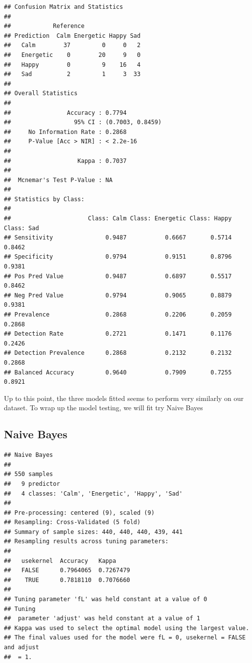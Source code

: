 \documentclass[11pt,]{article}
\begin{document}
\begin{verbatim}
## Confusion Matrix and Statistics
## 
##            Reference
## Prediction  Calm Energetic Happy Sad
##   Calm        37         0     0   2
##   Energetic    0        20     9   0
##   Happy        0         9    16   4
##   Sad          2         1     3  33
## 
## Overall Statistics
##                                           
##                Accuracy : 0.7794          
##                  95% CI : (0.7003, 0.8459)
##     No Information Rate : 0.2868          
##     P-Value [Acc > NIR] : < 2.2e-16       
##                                           
##                   Kappa : 0.7037          
##                                           
##  Mcnemar's Test P-Value : NA              
## 
## Statistics by Class:
## 
##                      Class: Calm Class: Energetic Class: Happy Class: Sad
## Sensitivity               0.9487           0.6667       0.5714     0.8462
## Specificity               0.9794           0.9151       0.8796     0.9381
## Pos Pred Value            0.9487           0.6897       0.5517     0.8462
## Neg Pred Value            0.9794           0.9065       0.8879     0.9381
## Prevalence                0.2868           0.2206       0.2059     0.2868
## Detection Rate            0.2721           0.1471       0.1176     0.2426
## Detection Prevalence      0.2868           0.2132       0.2132     0.2868
## Balanced Accuracy         0.9640           0.7909       0.7255     0.8921
\end{verbatim}

Up to this point, the three models fitted seems to perform very
similarly on our dataset. To wrap up the model testing, we will fit try
Naive Bayes

\hypertarget{naive-bayes}{%
\subsection{Naive Bayes}\label{naive-bayes}}

\begin{verbatim}
## Naive Bayes 
## 
## 550 samples
##   9 predictor
##   4 classes: 'Calm', 'Energetic', 'Happy', 'Sad' 
## 
## Pre-processing: centered (9), scaled (9) 
## Resampling: Cross-Validated (5 fold) 
## Summary of sample sizes: 440, 440, 440, 439, 441 
## Resampling results across tuning parameters:
## 
##   usekernel  Accuracy   Kappa    
##   FALSE      0.7964065  0.7267479
##    TRUE      0.7818110  0.7076660
## 
## Tuning parameter 'fL' was held constant at a value of 0
## Tuning
##  parameter 'adjust' was held constant at a value of 1
## Kappa was used to select the optimal model using the largest value.
## The final values used for the model were fL = 0, usekernel = FALSE and adjust
##  = 1.
\end{verbatim}
\end{document}
